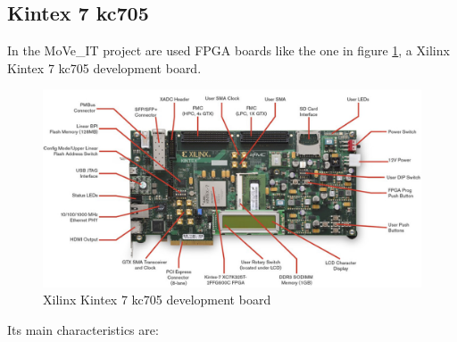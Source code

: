 \subsection{Kintex 7 kc705}
\noindent In the MoVe\_IT project are used FPGA boards like the one in figure \ref{fig:kintex}, a Xilinx Kintex 7 kc705 development board\cite{kintex7}.
\begin{figure}[H]
	\centering
	\includegraphics[width=0.9\linewidth]{IMG/ch3/KINTEX}
	\caption{Xilinx Kintex 7 kc705 development board}
	\label{fig:kintex}
\end{figure}
\noindent Its main characteristics are:

